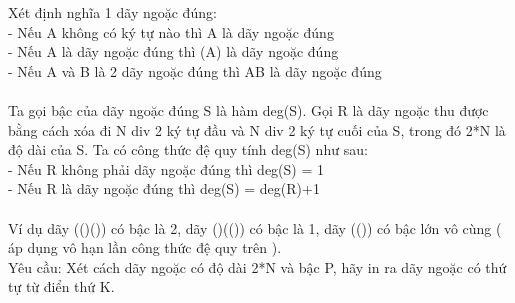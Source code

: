 Xét định nghĩa 1 dãy ngoặc đúng:   
\\   - Nếu A không có ký tự nào thì A là dãy ngoặc đúng   
\\   - Nếu A là dãy ngoặc đúng thì (A) là dãy ngoặc đúng   
\\   - Nếu A và B là 2 dãy ngoặc đúng thì AB là dãy ngoặc đúng   
\\
\\   Ta gọi bậc của dãy ngoặc đúng S là hàm deg(S). Gọi R là dãy ngoặc thu được bằng cách xóa đi N div 2 ký tự đầu và N div 2 ký tự cuối của S, trong đó 2*N là độ dài của S. Ta có công thức đệ quy tính deg(S) như sau:   
\\   - Nếu R không phải dãy ngoặc đúng thì deg(S) = 1   
\\   - Nếu R là dãy ngoặc đúng thì deg(S) = deg(R)+1   
\\
\\   Ví dụ dãy (()()) có bậc là 2, dãy ()(()) có bậc là 1, dãy (()) có bậc lớn vô cùng ( áp dụng vô hạn lần công thức đệ quy trên ).   
\\   Yêu cầu: Xét cách dãy ngoặc có độ dài 2*N và bậc P, hãy in ra dãy ngoặc có thứ tự từ điển thứ K.